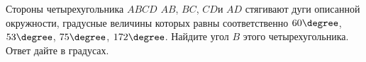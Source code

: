 \begin{ex}
	\begin{condition}
		 Стороны четырехугольника \( ABCD  \) \( AB \), \( BC \), \( CD  \)и \( AD  \) стягивают дуги описанной окружности, градусные величины которых равны соответственно \( 60  \degree\), \( 53  \degree\), \( 75  \degree\), \( 172  \degree\). Найдите угол \( B  \) этого четырехугольника. Ответ дайте в градусах.
	\end{condition}
\end{ex}